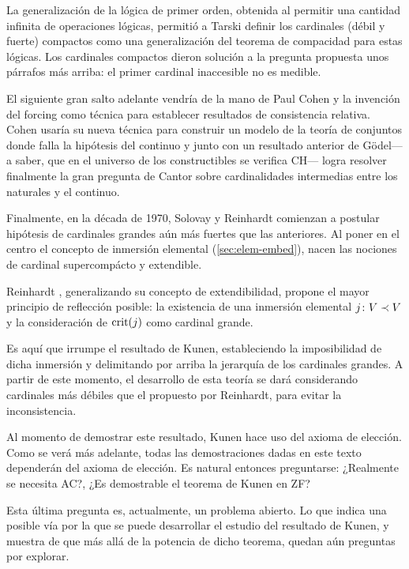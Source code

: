 La generalización de la lógica de primer orden, obtenida al
permitir una cantidad infinita de operaciones lógicas,
permitió a Tarski \autocite{tarski_problems_1966} definir los cardinales (débil y fuerte)
compactos como una generalización del teorema de compacidad
para estas lógicas. Los cardinales compactos dieron solución
a la pregunta propuesta unos párrafos más arriba:
el primer cardinal inaccesible no es medible.

El siguiente gran salto adelante vendría de la mano de
Paul Cohen \autocite{cohen_independence_1963,cohen_independence_1964}
y la invención del forcing como técnica
para establecer resultados de consistencia relativa.
Cohen usaría su nueva técnica para construir un modelo de la
teoría de conjuntos donde falla la hipótesis del continuo
y junto con un resultado anterior de Gödel---a saber, que
en el universo de los constructibles se verifica CH---%
logra resolver finalmente la gran pregunta de Cantor sobre cardinalidades
intermedias entre los naturales y el continuo.

Finalmente, en la década de 1970,
Solovay y Reinhardt comienzan a postular
hipótesis de cardinales grandes aún más fuertes
que las anteriores.
Al poner en el centro el concepto de inmersión elemental
(\ref{sec:elem-embed}),
nacen las nociones de cardinal supercompácto y extendible.

Reinhardt \autocite{reinhardt_ackermanns_1970},
generalizando su concepto de extendibilidad,
propone el mayor principio de reflección posible:
la existencia de una inmersión elemental $j\colon V\prec V$
y la consideración de $\operatorname{crit} (j)$ como cardinal grande.

Es aquí que irrumpe el resultado de Kunen,
estableciendo la imposibilidad de dicha inmersión
y delimitando por arriba la jerarquía de los cardinales
grandes. A partir de este momento, el desarrollo
de esta teoría se dará considerando cardinales más
débiles que el propuesto por Reinhardt,
para evitar la inconsistencia.

Al momento de demostrar este resultado, Kunen hace
uso del axioma de elección. Como se verá
más adelante, todas las demostraciones dadas en este texto
dependerán del axioma de elección.
Es natural entonces preguntarse: ¿Realmente se necesita AC?,
¿Es demostrable el teorema de Kunen en ZF?

Esta última pregunta es, actualmente, un problema abierto.
Lo que indica una posible vía por la que se puede desarrollar
el estudio del resultado de Kunen, y muestra de que más allá
de la potencia de dicho teorema, quedan aún preguntas por explorar.

